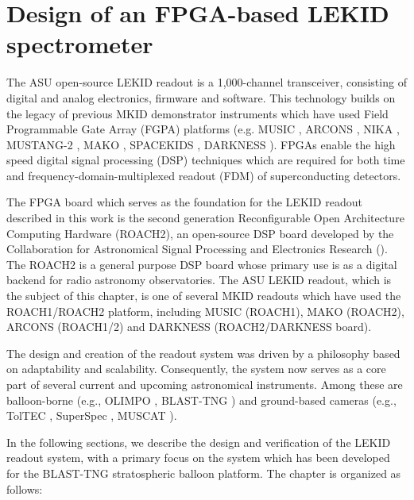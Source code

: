 \chapter{Design of an FPGA-based LEKID spectrometer}\label{readout}

The ASU open-source LEKID readout is a 1,000-channel transceiver, consisting of digital and analog electronics, firmware and software. This technology builds on the legacy of previous MKID demonstrator instruments which have used Field Programmable Gate Array (FGPA) platforms (e.g. MUSIC \citep{golwala2012status}, ARCONS \citep{mchugh2012readout}, NIKA \citep{monfardini2014latest}, MUSTANG-2 \citep{dicker2014mustang2}, MAKO \citep{swenson2012mako}, SPACEKIDS \citep{van2016multiplexed}, DARKNESS \citep{strader2016digitial}). FPGAs enable the high speed digital signal processing (DSP) techniques which are required for both time and frequency-domain-multiplexed readout (FDM) of superconducting detectors.

The FPGA board which serves as the foundation for the LEKID readout described in this work is the second generation Reconfigurable Open Architecture Computing Hardware (ROACH2), an open-source DSP board developed by the Collaboration for Astronomical Signal Processing and Electronics Research (\citet{werthimer2011casper, hickish2016decade}). The ROACH2 is a general purpose DSP board whose primary use is as a digital backend for radio astronomy observatories. The ASU LEKID readout, which is the subject of this chapter, is one of several MKID readouts which have used the ROACH1/ROACH2 platform, including MUSIC (ROACH1), MAKO (ROACH2), ARCONS (ROACH1/2) and DARKNESS (ROACH2/DARKNESS board).

The design and creation of the readout system was driven by a philosophy based on adaptability and scalability. Consequently, the system now serves as a core part of several current and upcoming astronomical instruments. Among these are balloon-borne (e.g., OLIMPO \citep{masi2019kinetic}, BLAST-TNG \citep{gordon2016}) and ground-based cameras (e.g., TolTEC \citep{austermann2018millimeter}, SuperSpec \citep{wheeler2018superspec}, MUSCAT \citep{brien2018muscat}).

In the following sections, we describe the design and verification of the LEKID readout system, with a primary focus on the system which has been developed for the BLAST-TNG stratospheric balloon platform. The chapter is organized as follows:

